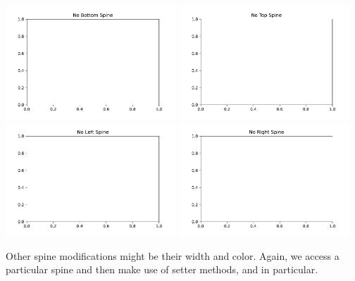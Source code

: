 
\vspace{-0.2cm}
\begin{center}
    \includegraphics[width = 0.48\textwidth]{figures/proseplots/spine-vis-bottom.pdf} \includegraphics[width = 0.48\textwidth]{figures/proseplots/spine-vis-top.pdf}
    \includegraphics[width = 0.48\textwidth]{figures/proseplots/spine-vis-left} \includegraphics[width = 0.48\textwidth]{figures/proseplots/spine-vis-right.pdf}
\end{center}

Other spine modifications might be their width and color. Again, we access a particular spine and then make use of setter methods,  and  in particular. 

